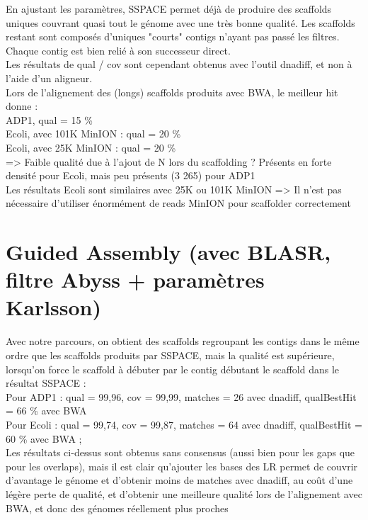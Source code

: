 \documentclass[12pt]{article}
\begin{document}
En ajustant les paramètres, SSPACE permet déjà de produire des scaffolds uniques couvrant quasi tout le génome avec
une très bonne qualité. Les scaffolds restant sont composés d'uniques "courts" contigs n'ayant pas passé les filtres. \\

Chaque contig est bien relié à son successeur direct. \\

Les résultats de qual / cov sont cependant obtenus avec l'outil dnadiff, et non à l'aide d'un aligneur. \\

Lors de l'alignement des (longs) scaffolds produits avec BWA, le meilleur hit donne : \\

ADP1, qual = 15 \% \\
Ecoli, avec 101K MinION : qual = 20 \% \\ 
Ecoli, avec 25K MinION : qual = 20 \% \\

=> Faible qualité due à l'ajout de N lors du scaffolding ? Présents en forte densité pour Ecoli, mais peu présents (3 265) pour ADP1 \\

Les résultats Ecoli sont similaires avec 25K ou 101K MinION => Il n'est pas nécessaire d'utiliser énormément de reads MinION pour scaffolder correctement \\

\section{Guided Assembly (avec BLASR, filtre Abyss + paramètres Karlsson)}

Avec notre parcours, on obtient des scaffolds regroupant les contigs dans le même ordre que les scaffolds produits par SSPACE, mais la qualité est supérieure, lorsqu'on force le scaffold à débuter par le contig débutant le scaffold dans le résultat SSPACE : \\

Pour ADP1 : qual = 99,96, cov = 99,99, matches = 26 avec dnadiff, qualBestHit = 66 \% avec BWA \\

Pour Ecoli : qual = 99,74, cov = 99,87, matches = 64 avec dnadiff, qualBestHit = 60 \% avec BWA ;  \\

Les résultats ci-dessus sont obtenus sans consensus (aussi bien pour les gaps que pour les overlaps), mais il est clair qu'ajouter les bases des LR permet de couvrir d'avantage le génome et d'obtenir moins de matches avec dnadiff, au coût d'une légère perte de qualité, et d'obtenir une meilleure qualité lors de l'alignement avec BWA, et donc des génomes réellement plus proches
\end{document}
